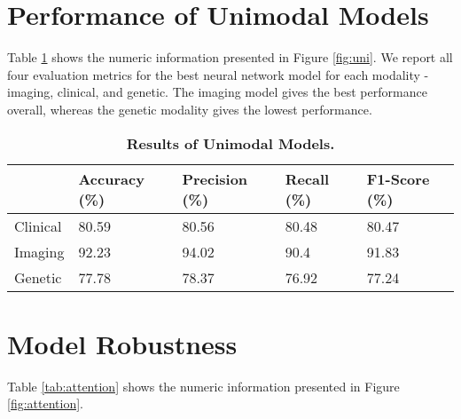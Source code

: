 \newpage
\section{Performance of Unimodal Models}
\label{eval_unimodal}
Table \ref{tab:uni} shows the numeric information presented in Figure \ref{fig:uni}. We report all four evaluation metrics for the best
neural network model for each modality - imaging, clinical, and genetic. The imaging model gives the best
performance overall, whereas the genetic modality gives the lowest performance. 

\begin{table}[H]
\caption{\textbf{Results of Unimodal Models.}}\label{tab:uni}
\centering
\begin{tabular}{|l|l|l|l|l|}
\hline
\textbf{} & \textbf{Accuracy (\%)} & \textbf{Precision (\%)} & \textbf{Recall (\%)} & \textbf{F1-Score (\%)} \\ \hline
Clinical  & 80.59             & 80.56              & 80.48           & 80.47             \\ \hline
Imaging   & 92.23             & 94.02              & 90.4            & 91.83             \\ \hline
Genetic   & 77.78             & 78.37              & 76.92           & 77.24             \\ \hline
\end{tabular}
\end{table}


\section{Model Robustness}
\label{tab_boxplot}
Table \ref{tab:attention} shows the numeric information presented in Figure \ref{fig:attention}.

